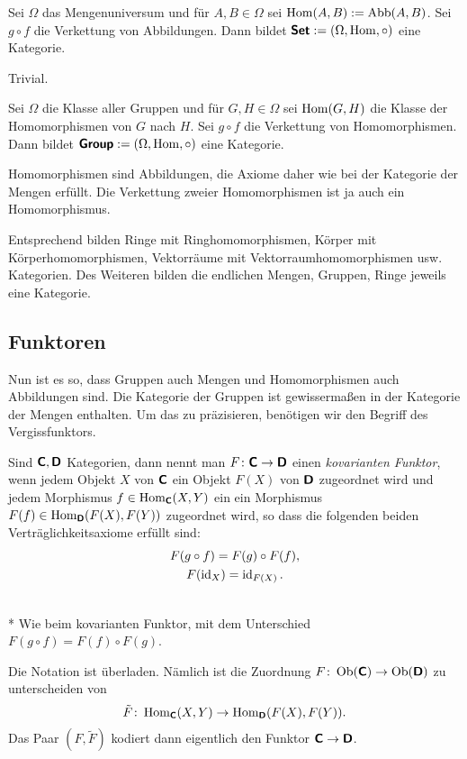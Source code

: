 \begin{Satz}\newlinefirst
Sei $\Omega$ das Mengenuniversum und für $A,B\in\Omega$ sei
$\operatorname{Hom}(A,B):=\operatorname{Abb}(A,B)$. Sei $g\circ f$ die Verkettung
von Abbildungen. Dann bildet $\textsf{\textbf{Set}}:=(\Omega,\operatorname{Hom},\circ)$
eine Kategorie.
\end{Satz}
 Trivial.\;\qedsymbol

\begin{Satz}\newlinefirst
Sei $\Omega$ die Klasse aller Gruppen und für $G,H\in\Omega$ sei
$\operatorname{Hom}(G,H)$ die Klasse der Homomorphismen von $G$ nach $H$.
Sei $g\circ f$ die Verkettung von Homomorphismen.
Dann bildet $\textsf{\textbf{Group}}:=(\Omega,\operatorname{Hom},\circ)$
eine Kategorie.
\end{Satz}
 Homomorphismen sind Abbildungen, die Axiome
daher wie bei der Kategorie der Mengen erfüllt. Die Verkettung
zweier Homomorphismen ist ja auch ein Homomorphismus.\;\qedsymbol

Entsprechend bilden Ringe mit Ringhomomorphismen, Körper mit
Körperhomomorphismen, Vektorräume mit Vektorraumhomomorphismen
usw. Kategorien. Des Weiteren bilden die endlichen Mengen, Gruppen,
Ringe jeweils eine Kategorie.

\subsection{Funktoren}

Nun ist es so, dass Gruppen auch Mengen und Homomorphismen
auch Abbildungen sind. Die Kategorie der Gruppen ist gewissermaßen
in der Kategorie der Mengen enthalten. Um das zu präzisieren,
benötigen wir den Begriff des Vergissfunktors.

\begin{Definition}\newlinefirst
Sind $\textsf{\textbf{C}},\textsf{\textbf{D}}$ Kategorien, dann nennt man
$F\colon\textsf{\textbf{C}}\to\textsf{\textbf{D}}$ einen
\emph{kovarianten Funktor}, wenn jedem Objekt $X$ von $\textsf{\textbf{C}}$ ein Objekt
$F(X)$ von $\textsf{\textbf{D}}$ zugeordnet wird und jedem Morphismus
$f\in\operatorname{Hom}_{\textsf{\textbf{C}}}(X,Y)$ ein ein Morphismus
$F(f)\in\operatorname{Hom}_{\textsf{\textbf{D}}}(F(X),F(Y))$ zugeordnet wird,
so dass die folgenden beiden Verträglichkeitsaxiome erfüllt sind:%
\begin{gather*}
F(g\circ f) = F(g)\circ F(f),\\
F(\operatorname{id}_X) = \operatorname{id}_{F(X)}.
\end{gather*}
\end{Definition}
\begin{Definition}\mbox{}\\*
Wie beim kovarianten Funktor, mit dem Unterschied
$F(g\circ f) = F(f)\circ F(g)$.
\end{Definition}
 Die Notation ist überladen. Nämlich ist die Zuordnung
$F\colon\operatorname{Ob}(\textsf{\textbf{C}})\to\operatorname{Ob}(\textsf{\textbf{D}})$ zu unterscheiden
von
\[\tilde F\colon\operatorname{Hom}_{\textsf{\textbf{C}}}(X,Y)\to\operatorname{Hom}_{\textsf{\textbf{D}}}(F(X),F(Y)).\]
Das Paar $(F,\tilde F)$ kodiert dann eigentlich den Funktor
$\textsf{\textbf{C}}\to\textsf{\textbf{D}}$.

